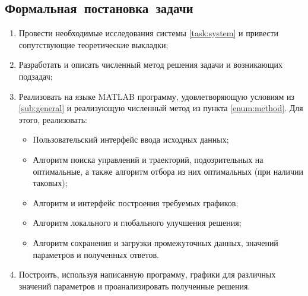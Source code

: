 \documentclass[11pt, oneside, final]{article}
\theoremstyle{break}
\numberwithin{equation}{section}
\theoremstyle{plain}
\theoremstyle{definition}
\begin{document}
    \subsection{Формальная~постановка~задачи} 
    \label{sub:formal}
    \begin{enumerate}
        \item Провести необходимые исследования системы \eqref{task:system} и привести сопутствующие теоретические выкладки;
        \item \label{enum:method} Разработать и описать численный метод решения задачи и возникающих подзадач;
        \item Реализовать на языке MATLAB программу, удовлетворяющую условиям из \ref{sub:general} и реализующую численный метод из пункта \ref{enum:method}.
        Для этого, реализовать:
        \begin{itemize}
            \item  Пользовательский интерфейс ввода исходных данных;
            \item  Алгоритм поиска управлений и траекторий, подозрительных на оптимальные, а также алгоритм отбора из них оптимальных (при наличии таковых);
            \item  Алгоритм и интерфейс построения требуемых графиков;
            \item  Алгоритм локального и глобального улучшения решения; 
            \item  Алгоритм сохранения и загрузки промежуточных данных, значений параметров и полученных ответов.
        \end{itemize}
        \item Построить, используя написанную программу, графики для различных значений параметров и проанализировать полученные решения.
    \end{enumerate}
    \pagebreak
\end{document}
